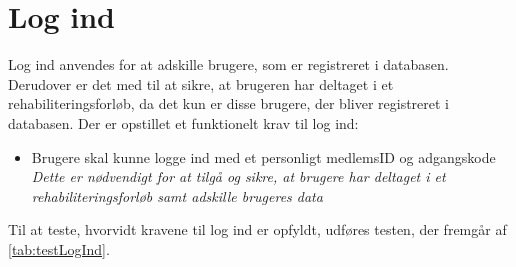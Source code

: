 \section{Log ind}
Log ind anvendes for at adskille brugere, som er registreret i databasen. Derudover er det med til at sikre, at brugeren har deltaget i et rehabiliteringsforløb, da det kun er disse brugere, der bliver registreret i databasen. Der er opstillet et funktionelt krav til log ind:

\begin{itemize}
\item Brugere skal kunne logge ind med et personligt medlemsID og adgangskode
\\
\textit{Dette er nødvendigt for at tilgå og sikre, at brugere har deltaget i et rehabiliteringsforløb samt adskille brugeres data}
\end{itemize}

\noindent
Til at teste, hvorvidt kravene til log ind er opfyldt, udføres testen, der fremgår af \autoref{tab:testLogInd}.

